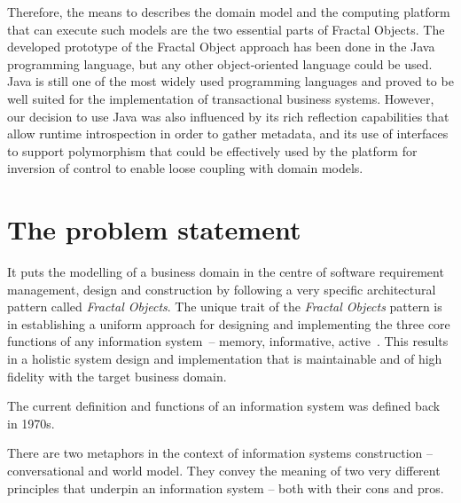 \documentclass[a4paper,12pt,oneside,openright,final]{memoir} %
\begin{document}
  Therefore, the means to describes the domain model and the computing platform that can execute such models are the two essential parts of Fractal Objects.
  The developed prototype of the Fractal Object approach has been done in the Java programming language, but any other object-oriented language could be used.
  Java is still one of the most widely used programming languages and proved to be well suited for the implementation of transactional business systems.
  However, our decision to use Java was also influenced by its rich reflection capabilities that allow runtime introspection in order to gather metadata, and its use of interfaces to support polymorphism that could be effectively used by the platform for inversion of control to enable loose coupling with domain models.

  



























\section*{The problem statement}

	It puts the modelling of a business domain in the centre of software requirement management, design and construction by following a very specific architectural pattern called \emph{Fractal Objects}.
	The unique trait of the \emph{Fractal Objects} pattern is in establishing a uniform approach for designing and implementing the three core functions of any information system~-- memory, informative, active~\cite{oli2007}.
	This results in a holistic system design and implementation that is maintainable and of high fidelity with the target business domain.

	The current definition and functions of an information system was defined back in 1970s.
	

	
	There are two metaphors in the context of information systems construction -- conversational and world model.
	They convey the meaning of two very different principles that underpin an information system -- both with their cons and pros.
	
\end{document}
